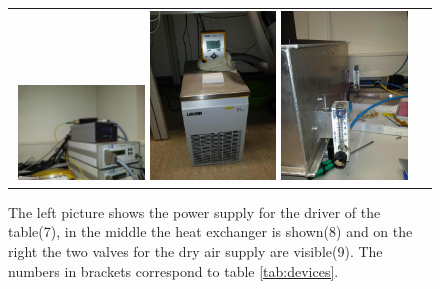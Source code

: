 \documentclass{article}
\begin{document}
\begin{figure}[tbhn]
\begin{center}
\begin{tabular}{cc}
\includegraphics[width=0.32\textwidth]{pictures/DriverTable.jpg}
\includegraphics[width=0.32\textwidth]{pictures/HeatExchanger.jpg}
\includegraphics[width=0.32\textwidth]{pictures/DryAirSupply.jpg}
\end{tabular}
\end{center}
\caption{The left picture shows the power supply for the driver of the table(7), in the middle the heat exchanger is shown(8) and on the right the two valves for the dry air supply are visible(9). The numbers in brackets correspond to table \ref{tab:devices}. }
\label{fig:CurrentAndVoltageTrigger}
\end{figure}

{}
 
\end{document}
